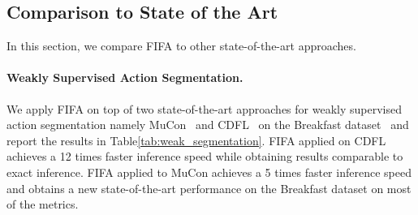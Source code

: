 \subsection{Comparison to State of the Art}



In this section, we compare FIFA to other state-of-the-art approaches.

\paragraph{Weakly Supervised Action Segmentation.}
We apply FIFA on top of two state-of-the-art approaches for weakly supervised action segmentation namely MuCon~\cite{mucon} and CDFL~\cite{CDFL} on the Breakfast dataset~\cite{breakfast} and report the results in Table\ref{tab:weak_segmentation}. FIFA applied on CDFL achieves a 12 times faster inference speed while obtaining results comparable to exact inference.
FIFA applied to MuCon achieves a 5 times faster inference speed and obtains a new state-of-the-art performance on the Breakfast dataset on most of the metrics.

